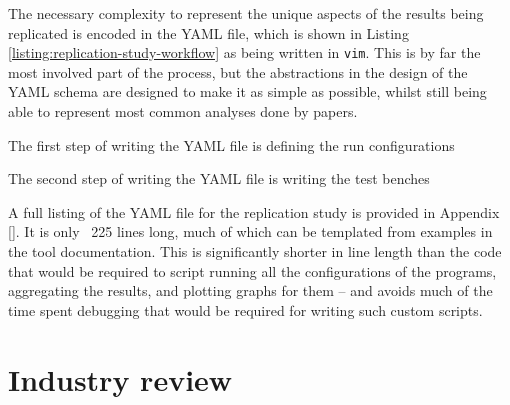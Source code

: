 The necessary complexity to represent the unique aspects of the results being replicated is encoded in the YAML file, which is shown in Listing \ref{listing:replication-study-workflow} as being written in \texttt{vim}. This is by far the most involved part of the process, but the abstractions in the design of the YAML schema are designed to make it as simple as possible, whilst still being able to represent most common analyses done by papers.

The first step of writing the YAML file is defining the run configurations

The second step of writing the YAML file is writing the test benches

A full listing of the YAML file for the replication study is provided in Appendix \ref{}. It is only ~225 lines long, much of which can be templated from examples in the tool documentation. This is significantly shorter in line length than the code that would be required to script running all the configurations of the programs, aggregating the results, and plotting graphs for them -- and avoids much of the time spent debugging that would be required for writing such custom scripts.





\section{Industry review}
\label{sec:hpc-multibench-industry-review} %

